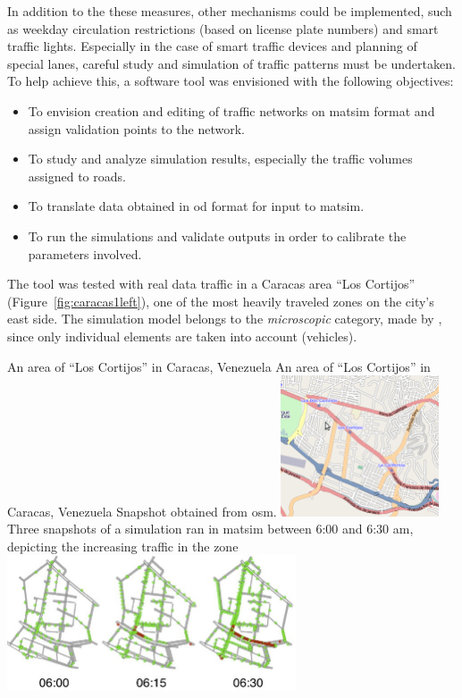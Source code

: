 In addition to the these measures, other mechanisms could be implemented, such as weekday circulation restrictions (\eg based on license plate numbers) and smart traffic lights. Especially in the case of smart traffic devices and planning of special lanes, careful study and simulation of traffic patterns must be undertaken. To help achieve this, a software tool was envisioned with the following objectives:

\begin{itemize}
 \item To envision creation and editing of traffic networks on \gls{matsim} format and assign validation points to the network.

\item To study and analyze simulation results, especially the traffic volumes assigned to roads.

\item To translate data obtained in \gls{od} format for input to \gls{matsim}.

\item To run the simulations and validate outputs in order to calibrate the parameters involved.
\end{itemize}

The tool was tested with real data traffic in a Caracas area ``Los Cortijos'' (Figure~\ref{fig:caracas1left}), one of the most heavily traveled zones on the city's east side. The simulation model belongs to the \emph{microscopic} category, made by \citet{gartner2001}, since only individual elements are taken into account (\ie vehicles).

\createfigure%
{An area of ``Los Cortijos'' in Caracas, Venezuela}%
{An area of ``Los Cortijos'' in Caracas, Venezuela}%
{\label{fig:caracas1}}%
{%
 \createsubfigure%
 {Snapshot obtained from \gls{osm}.}
 {\includegraphics[width=0.35\textwidth, angle=0]{./scenarios/figures/caracas0.png}}
 {\label{fig:caracas1left}}
\createsubfigure%
 {Three snapshots of a simulation ran in \gls{matsim} between 6:00 and 6:30 am, depicting the increasing traffic in the zone}
 {\includegraphics[width=0.64\textwidth, angle=0]{./scenarios/figures/caracas1.jpg}}
 {\label{fig:caracas1right}}
}%
{}

